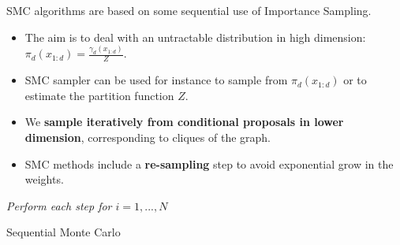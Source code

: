 \documentclass[portrait,final,a0paper,fontscale=0.277]{baposter}
\begin{document}
\begin{poster}
{\begin{multicols}{2}
\noindent SMC algorithms are based on some sequential use of Importance Sampling.

\begin{itemize}
 \item  The aim is to deal with an untractable distribution in high dimension: $\pi_d(x_{1:d})=\frac{\gamma_d(x_{1:d})}{Z}$. 
 \item SMC sampler can be used for instance to sample from $\pi_d(x_{1:d})$ or to estimate the partition function $Z$.
\item We \textbf{sample iteratively from conditional proposals in lower dimension}, corresponding to cliques of the graph.
\item SMC methods include a \textbf{re-sampling} step to avoid exponential grow in the weights.
\end{itemize}
\columnbreak

\begin{algorithm}[H]
\label{alg:qquad}
\DontPrintSemicolon
\textit{Perform each step for $i=1,...,N$}\;
\caption{Sequential Monte Carlo}
\end{algorithm}


\end{multicols}
   \vspace{0.3em}
   
   


 }







\end{poster}
\end{document}
